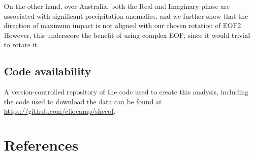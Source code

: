 \documentclass[smallextended]{svjour3}       %
\begin{document}
On the other hand, over Australia, both the Real and Imaginary phase are associated with significant precipitation anomalies, and we further show that the direction of maximum impact is not aligned with our chosen rotation of EOF2. However, this underscore the benefit of using complex EOF, since it would trivial to rotate it.

\hypertarget{code-availability}{%
\subsection*{Code availability}\label{code-availability}}

A version-controlled repository of the code used to create this analysis, including the code used to download the data can be found at \url{https://github.com/eliocamp/shceof}.

\hypertarget{references}{%
\section{References}\label{references}}




\end{document}
